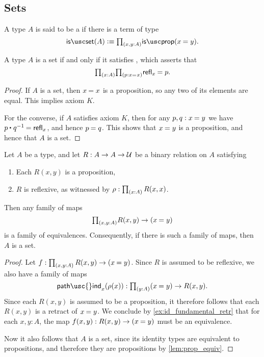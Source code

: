 \subsection{Sets}

\begin{defn}
A type $A$ is said to be a  if there is a term of type
\begin{equation*}
\isset(A)\defeq \prd{x,y:A}\isprop(\id{x}{y}).
\end{equation*}
\end{defn}

\begin{lem}
A type $A$ is a set if and only if it satisfies , which asserts that
\begin{equation*}
\prd{x:A}{p:\id{x}{x}}\id{\refl{x}}{p}.
\end{equation*}
\end{lem}

\begin{proof}
If $A$ is a set, then $\id{x}{x}$ is a proposition, so any two of its elements are equal. 
This implies axiom $K$. 

For the converse, if $A$ satisfies axiom $K$, then for any $p,q:\id{x}{y}$ we have $\id{\ct{p}{q^{-1}}}{\refl{x}}$, and hence $\id{p}{q}$. This shows that $\id{x}{y}$ is a proposition, and hence that $A$ is a set.
\end{proof}

\begin{lem}\label{lem:prop_to_id}
Let $A$ be a type, and let $R:A\to A\to\mathcal{U}$ be a binary relation on $A$ satisfying
\begin{enumerate}
\item Each $R(x,y)$ is a proposition,
\item $R$ is reflexive, as witnessed by $\rho:\prd{x:A}R(x,x)$.
\end{enumerate}
Then any family of maps
\begin{equation*}
\prd{x,y:A}R(x,y)\to (\id{x}{y})
\end{equation*}
is a family of equivalences. Consequently, if there is such a family of maps, then $A$ is a set.
\end{lem}

\begin{proof}
Let $f:\prd{x,y:A}R(x,y)\to(\id{x}{y})$. 
Since $R$ is assumed to be reflexive, we also have a family of maps
\begin{equation*}
\mathsf{path\usc{}ind}_x(\rho(x)):\prd{y:A}(\id{x}{y})\to R(x,y).
\end{equation*}
Since each $R(x,y)$ is assumed to be a proposition, it therefore follows that each $R(x,y)$ is a retract of $\id{x}{y}$. We conclude by \cref{ex:id_fundamental_retr} that for each $x,y:A$, the map $f(x,y):R(x,y)\to(\id{x}{y})$ must be an equivalence.

Now it also follows that $A$ is a set, since its identity types are equivalent to propositions, and therefore they are propositions by \cref{lem:prop_equiv}. 
\end{proof}


